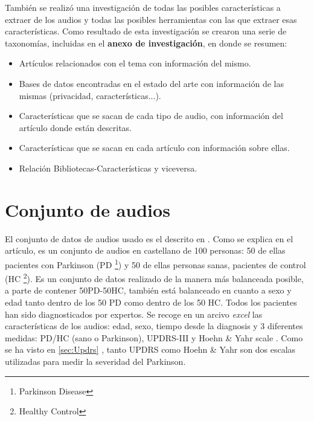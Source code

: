 También se realizó una investigación de todas las posibles características a extraer de los audios y todas las posibles herramientas con las que extraer esas características. Como resultado de esta investigación se crearon una serie de taxonomías, incluidas en el \textbf{anexo de investigación}, en donde se resumen:
\begin{itemize}
\item Artículos relacionados con el tema con información del mismo.
\item Bases de datos encontradas en el estado del arte con información de las mismas (privacidad, características...).
\item Características que se sacan de cada tipo de audio, con información del artículo donde están descritas.
\item Características que se sacan en cada artículo con información sobre ellas.
\item Relación Bibliotecas-Características y viceversa.
\end{itemize}


\section{Conjunto de audios}
El conjunto de datos de audios usado es el descrito en \cite{OrzCorpus}. Como se explica en el artículo, es un conjunto de audios en castellano de 100 personas: 50 de ellas pacientes con Parkinson (PD \footnote{Parkinson Disease}) y 50 de ellas personas sanas, pacientes de control (HC \footnote{Healthy Control}). Es un conjunto de datos realizado de la manera más balanceada posible, a parte de contener 50PD-50HC, también está balanceado en cuanto a sexo y edad tanto dentro de los 50 PD como dentro de los 50 HC. Todos los pacientes han sido diagnosticados por expertos. Se recoge en un arcivo \textit{excel} las características de los audios: edad, sexo, tiempo desde la diagnosis y 3 diferentes medidas: PD/HC (sano o Parkinson), UPDRS-III \cite{updrs} y  Hoehn \& Yahr scale \cite{hoehn1967}. Como se ha visto en \ref{sec:Updrs} , tanto UPDRS como Hoehn \& Yahr son dos escalas utilizadas para medir la severidad del Parkinson.


